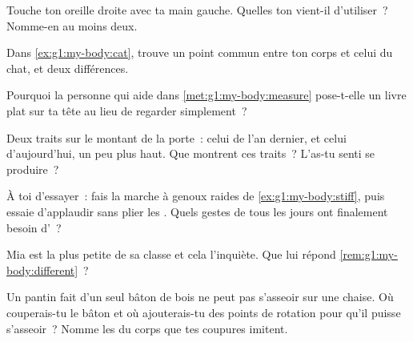 \begin{exercise}[$\star$]\label{exo:g1:my-body:4}
Touche ton oreille droite avec ta main gauche. Quelles 
ton  vient-il d'utiliser~? Nomme-en au moins deux.
\end{exercise}

\begin{exercise}[$\star$]\label{exo:g1:my-body:5}
Dans \cref{ex:g1:my-body:cat}, trouve un point commun entre ton
corps et celui du chat, et deux différences.
\end{exercise}

\begin{exercise}[$\star$]\label{exo:g1:my-body:6}
Pourquoi la personne qui aide dans \cref{met:g1:my-body:measure}
pose-t-elle un livre plat sur ta tête au lieu de regarder simplement~?
\end{exercise}

\begin{exercise}[$\star$]\label{exo:g1:my-body:7}
Deux traits sur le montant de la porte~: celui de l'an dernier, et
celui d'aujourd'hui, un peu plus haut. Que montrent ces traits~?
L'as-tu senti se produire~?
\end{exercise}

\begin{exercise}[$\star$]\label{exo:g1:my-body:8}
À toi d'essayer~: fais la marche à genoux raides de
\cref{ex:g1:my-body:stiff}, puis essaie d'applaudir sans plier les
. Quels gestes de tous les jours ont finalement besoin
d'~?
\end{exercise}

\begin{exercise}[$\star\star$]\label{exo:g1:my-body:9}
Mia est la plus petite de sa classe et cela l'inquiète. Que lui
répond \cref{rem:g1:my-body:different}~?
\end{exercise}

\begin{exercise}[$\star\star$]\label{exo:g1:my-body:10}
Un pantin fait d'un seul bâton de bois ne peut pas s'asseoir sur une
chaise. Où couperais-tu le bâton et où ajouterais-tu des points de
rotation pour qu'il puisse s'asseoir~? Nomme les  du
corps que tes coupures imitent.
\end{exercise}
